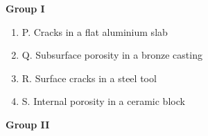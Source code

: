 \documentclass[journal,12pt,onecolumn]{IEEEtran}
\theoremstyle{remark}
\begin{document}
\begin{enumerate}
    \begin{minipage}{0.45\textwidth}
    \textbf{Group I}
    \vspace{-4pt}
    \begin{enumerate}[label=(\Alph*)]
    \item P. Cracks in a flat aluminium slab
    \item Q. Subsurface porosity in a bronze casting
    \item R. Surface cracks in a steel tool
    \item S. Internal porosity in a ceramic block
    \end{enumerate}
    \end{minipage}%
    \begin{minipage}{0.45\textwidth}
    \textbf{Group II}
    \vspace{-4pt}
    

\end{minipage}
\end{enumerate}
\end{document}
